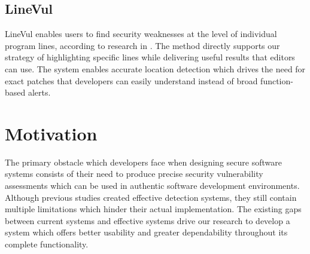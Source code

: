 \section{LineVul}
LineVul enables users to find security weaknesses at the level of individual program lines, according to research in \cite{linevul}. The method directly supports our strategy of highlighting specific lines while delivering useful results that editors can use. The system enables accurate location detection which drives the need for exact patches that developers can easily understand instead of broad function-based alerts.

\chapter{Motivation}
\label{ch:motivation}

The primary obstacle which developers face when designing secure software systems consists of their need to produce precise security vulnerability assessments which can be used in authentic software development environments. Although previous studies created effective detection systems, they still contain multiple limitations which hinder their actual implementation. The existing gaps between current systems and effective systems drive our research to develop a system which offers better usability and greater dependability throughout its complete functionality.


